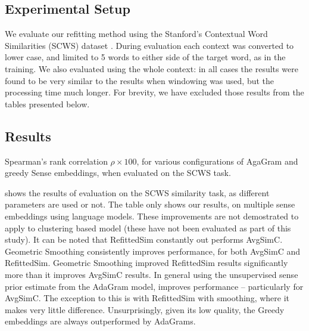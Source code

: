\documentclass{sig-alternate}
\begin{document}
\subsection{Experimental Setup}
We evaluate our refitting method using the Stanford's Contextual Word Similarities (SCWS) dataset \parencite{Huang2012}.
During evaluation each context was converted to lower case, and limited to 5 words to either side of the target word, as in the training.
We also evaluated using the whole context: in all cases the results were found to be very similar to the results when windowing was used, but the processing time much longer.
For brevity, we have excluded those results from the tables presented below.


\subsection{Results}

\begin{table}
	\begin{adjustbox}{max width=\columnwidth}
	\end{adjustbox}
\caption{Spearman's rank correlation $\rho \times 100$, for various configurations of AgaGram and greedy Sense embeddings, when evaluated on the SCWS task.} \label{swscres}
\end{table}

 shows the results of evaluation on the SCWS similarity task, as different parameters are used or not. The table only shows our results, on multiple sense embeddings using language models. These improvements are not demostrated to apply to clustering based model (these have not been evaluated as part of this study).
It can be noted that RefittedSim constantly out performs AvgSimC.
Geometric Smoothing consistently improves performance, for both AvgSimC and RefittedSim. Geometric Smoothing improved RefittedSim results significantly more than it improves AvgSimC results.
In general using the unsupervised sense prior estimate from the AdaGram model, improves performance -- particularly for AvgSimC. The exception to this is with RefittedSim with smoothing, where it makes very little difference. 
Unsurprisingly, given its low quality, the Greedy embeddings are always outperformed by AdaGrams.
\end{document}
